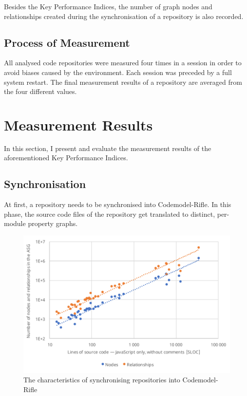Besides the Key Performance Indices, the number of graph nodes and relationships created during the synchronisation of a repository is also recorded.


\subsection{Process of Measurement}

All analysed code repositories were measured four times in a session in order to avoid biases caused by the environment. Each session was preceded by a full system restart. The final measurement results of a repository are averaged from the four different values.


\section{Measurement Results}

In this section, I present and evaluate the measurement results of the aforementioned Key Performance Indices.


\subsection{Synchronisation}

At first, a repository needs to be synchronised into Codemodel-Rifle. In this phase, the source code files of the repository get translated to distinct, per-module property graphs.

\begin{figure}[!htb]
	\centerfloat
	\includegraphics[width=\textwidth,clip]{figures/measurement-nodes-relationships-sloc.pdf}
	\caption{The characteristics of synchronising repositories into Codemodel-Rifle}
	\label{fig:measurement-nodes-relationships-sloc}
\end{figure}

